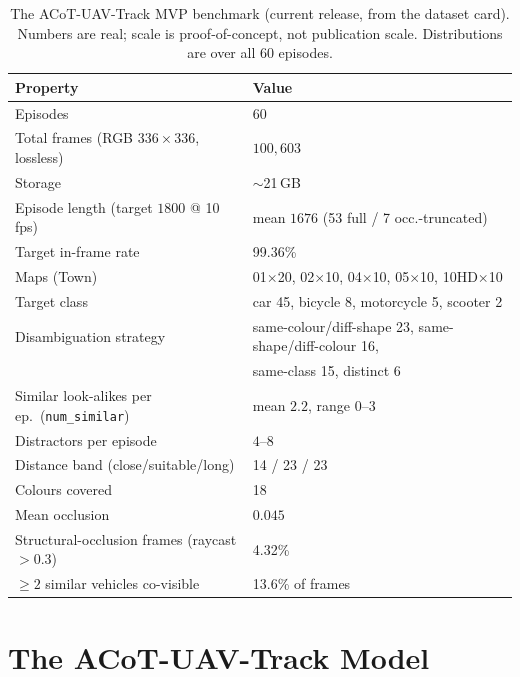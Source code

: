 \documentclass[11pt]{article}
\newcommand{\sys}{ACoT-UAV-Track}
\begin{document}
\begin{table}[t]
\centering
\caption{The \sys{} MVP benchmark (current release, from the dataset card).
Numbers are real; scale is proof-of-concept, not publication scale.
Distributions are over all $60$ episodes.}
\label{tab:dataset}
\small
\begin{tabular}{@{}ll@{}}
\toprule
Property & Value \\
\midrule
Episodes & $60$ \\
Total frames (RGB $336{\times}336$, lossless) & $100{,}603$ \\
Storage & $\sim$21\,GB \\
Episode length (target $1800$ @ 10\,fps) & mean $1676$ (53 full / 7 occ.-truncated) \\
Target in-frame rate & 99.36\% \\
Maps (Town) & 01$\times$20, 02$\times$10, 04$\times$10, 05$\times$10, 10HD$\times$10 \\
Target class & car 45, bicycle 8, motorcycle 5, scooter 2 \\
Disambiguation strategy & same-colour/diff-shape 23, same-shape/diff-colour 16, \\
 & same-class 15, distinct 6 \\
Similar look-alikes per ep.\ (\texttt{num\_similar}) & mean $2.2$, range $0$--$3$ \\
Distractors per episode & $4$--$8$ \\
Distance band (close/suitable/long) & 14 / 23 / 23 \\
Colours covered & 18 \\
Mean occlusion & $0.045$ \\
Structural-occlusion frames (raycast${>}0.3$) & 4.32\% \\
$\geq 2$ similar vehicles co-visible & 13.6\% of frames \\
\bottomrule
\end{tabular}
\end{table}

\section{The \sys{} Model}
\label{sec:method}

\end{document}
